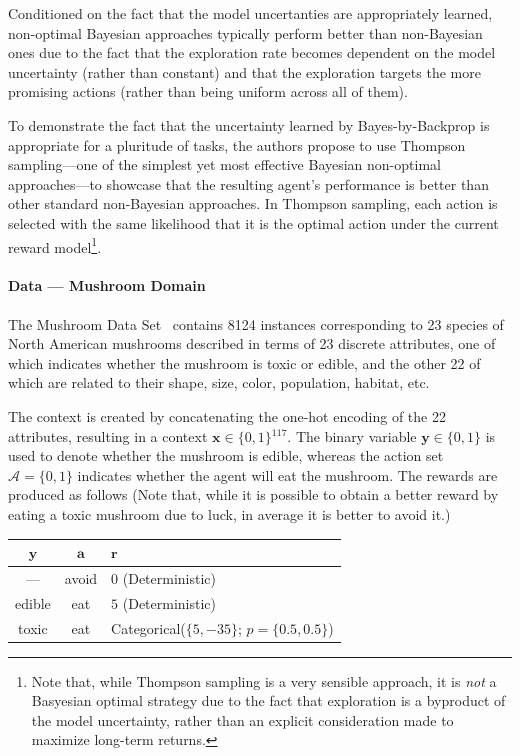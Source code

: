 \documentclass[11pt]{article}
\begin{document}
Conditioned on the fact that the model uncertanties are appropriately learned,
non-optimal Bayesian approaches typically perform better than non-Bayesian ones
due to the fact that the exploration rate becomes dependent on the model
uncertainty (rather than constant) and that the exploration targets the more
promising actions (rather than being uniform across all of them).

To demonstrate the fact that the uncertainty learned by Bayes-by-Backprop is
appropriate for a pluritude of tasks, the authors propose to use Thompson
sampling---one of the simplest yet most effective Bayesian non-optimal
approaches---to showcase that the resulting agent's performance is better than
other standard non-Bayesian approaches.  In Thompson sampling, each action is
selected with the same likelihood that it is the optimal action under the
current reward model\footnote{Note that, while Thompson sampling is a very
sensible approach, it is \emph{not} a Basyesian optimal strategy due to the
fact that exploration is a byproduct of the model uncertainty, rather than an
explicit consideration made to maximize long-term returns.}.  


\paragraph{Data --- Mushroom Domain} The Mushroom Data Set~\cite{mushroom}
contains 8124 instances corresponding to 23 species of North American mushrooms
described in terms of 23 discrete attributes, one of which indicates whether
the mushroom is toxic or edible, and the other 22 of which are related to their
shape, size, color, population, habitat, etc.

The context is created by concatenating the one-hot encoding of the 22
attributes, resulting in a context $\bm x\in \{0, 1\}{}^{117}$.  The binary
variable $\bm y\in\{0, 1\}$ is used to denote whether the mushroom is edible,
whereas the action set $\mathcal{A} = \{0, 1\}$ indicates whether the agent
will eat the mushroom.  The rewards are produced as follows (Note that, while
it is possible to obtain a better reward by eating a toxic mushroom due to
luck, in average it is better to avoid it.)

\begin{center}
\begin{tabular}{ccl}
  $\bm y$ & $\bm a$ & $\bm r$ \\ 
  \toprule
  --- & avoid & $0$ (Deterministic) \\
  edible & eat & $5$ (Deterministic) \\
  toxic & eat & Categorical\@($\{5, -35\}$; $p=\{0.5, 0.5\}$) \\  
\end{tabular}
\end{center}
\end{document}
